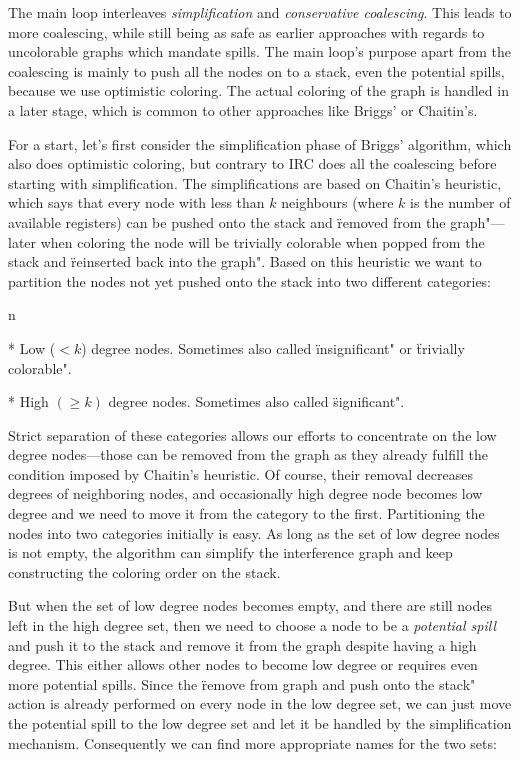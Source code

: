 The main loop interleaves {\em simplification} and {\em conservative
coalescing}. This leads to more coalescing, while still being as safe as earlier
approaches with regards to uncolorable graphs which mandate spills. The main
loop's purpose apart from the coalescing is mainly to push all the nodes on to a
stack, even the potential spills, because we use optimistic coloring. The actual
coloring of the graph is handled in a later stage, which is common to other
approaches like Briggs' or Chaitin's.

For a start, let's first consider the simplification phase of Briggs' algorithm,
which also does optimistic coloring, but contrary to IRC does all the coalescing
before starting with simplification. The simplifications are based on
Chaitin's heuristic, which says that every node with less than $k$
neighbours (where $k$ is the number of available registers) can be pushed onto
the stack and \"removed from the graph"---later when coloring the node will be
trivially colorable when popped from the stack and \"reinserted back into the
graph". Based on this heuristic we want to partition the nodes not yet pushed
onto the stack into two different categories:

\begitems \style n

* Low ($<k$) degree nodes. Sometimes also called \"insignificant" or \"trivially
colorable".

* High $(\geq k)$ degree nodes. Sometimes also called \"significant".

\enditems

Strict separation of these categories allows our efforts to concentrate on the
low degree nodes---those can be removed from the graph as they already fulfill
the condition imposed by Chaitin's heuristic. Of course, their removal
decreases degrees of neighboring nodes, and occasionally high degree node
becomes low degree and we need to move it from the category to the first.
Partitioning the nodes into two categories initially is easy. As long as the set
of low degree nodes is not empty, the algorithm can simplify the interference
graph and keep constructing the coloring order on the stack.

But when the set of low degree nodes becomes empty, and there are still nodes
left in the high degree set, then we need to choose a node to be a {\em
potential spill} and push it to the stack and remove it from the graph despite
having a high degree. This either allows other nodes to become low degree or
requires even more potential spills. Since the \"remove from graph and push onto
the stack" action is already performed on every node in the low degree set, we
can just move the potential spill to the low degree set and let it be handled by
the simplification mechanism. Consequently we can find more appropriate names
for the two sets:

